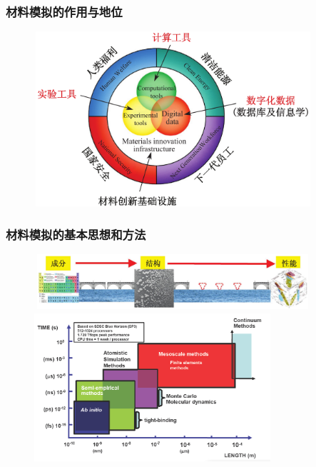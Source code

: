 \small
\frame
{
	\frametitle{材料模拟的作用与地位}
\begin{figure}[h!]
\vspace*{-0.18in}
\centering
\includegraphics[height=2.55in,width=4.05in]{Figures/MGE.png}
\label{MGE}
\end{figure}
}

\frame
{
	\frametitle{材料模拟的基本思想和方法}
\begin{figure}[h!]
\vspace*{-0.25in}
\centering
\includegraphics[height=0.80in,width=4.05in]{Figures/MGE-2.png}
\vskip 0.05pt
\includegraphics[height=2.20in,width=3.45in]{Figures/Multi-Scale-6.png}
\label{Multi-Scale}
\end{figure}
}

